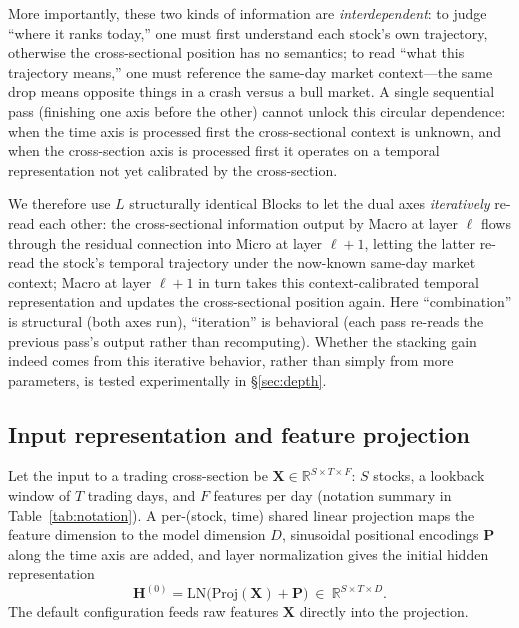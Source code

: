 \documentclass[a4paper,11pt]{article}
\begin{document}
More importantly, these two kinds of information are \emph{interdependent}: to
judge ``where it ranks today,'' one must first understand each stock's own
trajectory, otherwise the cross-sectional position has no semantics; to read
``what this trajectory means,'' one must reference the same-day market
context---the same drop means opposite things in a crash versus a bull market.
A single sequential pass (finishing one axis before the other) cannot unlock
this circular dependence: when the time axis is processed first the
cross-sectional context is unknown, and when the cross-section axis is
processed first it operates on a temporal representation not yet calibrated by
the cross-section.

We therefore use $L$ structurally identical Blocks to let the dual axes
\emph{iteratively} re-read each other: the cross-sectional information output by
Macro at layer $\ell$ flows through the residual connection into Micro at layer
$\ell{+}1$, letting the latter re-read the stock's temporal trajectory under
the now-known same-day market context; Macro at layer $\ell{+}1$ in turn takes
this context-calibrated temporal representation and updates the cross-sectional
position again. Here ``combination'' is structural (both axes run),
``iteration'' is behavioral (each pass re-reads the previous pass's output
rather than recomputing). Whether the stacking gain indeed comes from this
iterative behavior, rather than simply from more parameters, is tested
experimentally in \S\ref{sec:depth}.

\subsection{Input representation and feature projection}\label{sec:m-input}
Let the input to a trading cross-section be
$\bm{X}\in\mathbb{R}^{S\times T\times F}$: $S$ stocks, a lookback window of $T$
trading days, and $F$ features per day (notation summary in
Table~\ref{tab:notation}). A per-(stock, time) shared linear projection maps
the feature dimension to the model dimension $D$, sinusoidal positional
encodings $\bm{P}$ along the time axis are added, and layer normalization gives
the initial hidden representation
\begin{equation}\label{eq:input}
\bm{H}^{(0)} = \mathrm{LN}\big(\mathrm{Proj}(\bm{X}) + \bm{P}\big)\ \in\ \mathbb{R}^{S\times T\times D}.
\end{equation}
The default configuration feeds raw features $\bm{X}$ directly into the
projection.
\end{document}

